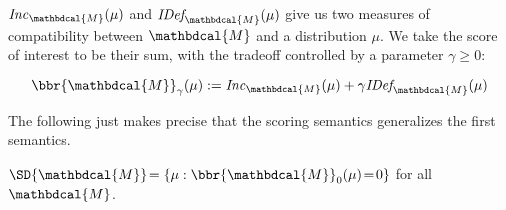 \documentclass[letterpaper]{article} %
\theoremstyle{plain}
\theoremstyle{definition}
\theoremstyle{remark}
\newcommand{\begthm}[3][]{\begin{#2}[{name=#1},restate=#3,label=#3]}
\newcommand{\dg}[1]{\mathbdcal{#1}}
\newcommand{\IDef}[1]{\mathit{IDef}_{\!#1}}
\newcommand\Inc{\mathit{Inc}}
\begin{document}
$\Inc_{\dg M}(\mu)$ and $\IDef{\dg M}(\mu)$ give us two measures
of compatibility between ${\dg M}$ and a distribution $\mu$.
We take the score of interest to be their sum, with the tradeoff
controlled by a parameter $\gamma \ge 0$:

\begin{equation}
  	  \bbr{\dg M}_\gamma(\mu)
	 := \Inc_{\dg M}(\mu) + \gamma \IDef{\dg M}(\mu)  \label{eqn:full-score}
\end{equation}

The following just makes precise that the scoring semantics generalizes the first semantics.

\begthm{prop}{prop:sd-is-zeroset}
	$\SD{\dg M} \!= \{ \mu : \bbr{\dg M}_0(\mu) \!=\! 0\}$ for 
	all $\dg M$.
\end{prop}
          
\end{document}
